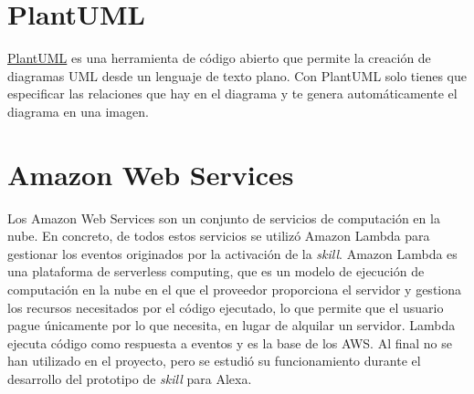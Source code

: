 \section{PlantUML}

\href{https://plantuml.com/es/}{PlantUML}\cite{PlantUML2020} es una herramienta de código abierto que permite la creación de diagramas UML desde un lenguaje de texto plano. Con PlantUML solo tienes que especificar las relaciones que hay en el diagrama y te genera automáticamente el diagrama en una imagen.

\section{Amazon Web Services}

Los Amazon Web Services\cite{AmazonWebServices2020} son un conjunto de servicios de computación en la nube. En concreto, de todos estos servicios se utilizó Amazon Lambda para gestionar los eventos originados por la activación de la \textit{skill}. Amazon Lambda es una plataforma de serverless computing\cite{ServerlessComputing2020}, que es un modelo de ejecución de computación en la nube en el que el proveedor proporciona el servidor y gestiona los recursos necesitados por el código ejecutado, lo que permite que el usuario pague únicamente por lo que necesita, en lugar de alquilar un servidor. Lambda ejecuta código como respuesta a eventos y es la base de los AWS. Al final no se han utilizado en el proyecto, pero se estudió su funcionamiento durante el desarrollo del prototipo de \textit{skill} para Alexa.